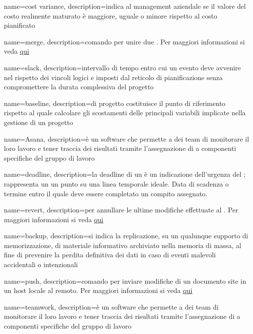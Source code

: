  {
	name=cost variance,
	description={indica al management aziendale se il valore del costo realmente maturato è maggiore, uguale o minore rispetto al costo pianificato}
}


 {
	name=merge,
	description={comando  per unire due . Per maggiori informazioni si veda \href{https://git-scm.com/docs/}{qui}}
}

 {
	name=slack,
	description={intervallo di tempo entro cui un evento deve avvenire nel rispetto dei vincoli logici e imposti dal reticolo di pianificazione senza compromettere la durata complessiva del progetto}
}

 {
	name=baseline,
	description={di progetto costituisce il punto di riferimento rispetto al quale calcolare gli scostamenti delle principali variabili implicate nella gestione di un progetto}
}

 {
	name=Asana,
	description={è un software che permette a dei team di monitorare il loro lavoro e tener traccia dei risultati tramite l'assegnazione di  a componenti specifiche del gruppo di lavoro}
}

 {
	name=deadline,
	description={la deadline di un  è un indicazione dell'urgenza del ; rappresenta un un punto su una linea temporale ideale. Data di scadenza o termine entro il quale deve essere completato un compito assegnato.}
}

 {
	name=revert,
	description={per annullare le ultime modifiche effettuate al . Per maggiori informazioni si veda \href{https://git-scm.com/docs/}{qui}}
}

 {
	name=backup,
	description={si indica la replicazione, su un qualunque supporto di memorizzazione, di materiale informativo archiviato nella memoria di massa, al fine di prevenire la perdita definitiva dei dati in caso di eventi malevoli accidentali o intenzionali}
}

 {
	name=push,
	description={comando  per inviare modifiche di un documento site in un host locale al  remoto. Per maggiori informazioni si veda \href{https://git-scm.com/docs/}{qui}}
}

 {
	name=teamwork,
	description={è un software che permette a dei team di monitorare il loro lavoro e tener traccia dei risultati tramite l'assegnazione di  a componenti specifiche del gruppo di lavoro}
}

